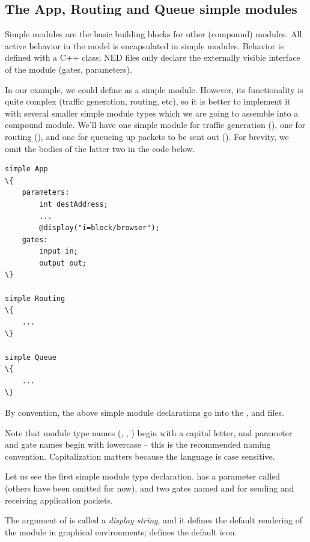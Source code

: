 \subsection{The App, Routing and Queue simple modules}

Simple modules are the basic building blocks for other (compound) modules.
All active behavior in the model is encapsulated in simple modules.
Behavior is defined with a C++ class; NED files only declare the externally
visible interface of the module (gates, parameters).

In our example, we could define  as a simple module. However,
its functionality is quite complex (traffic generation, routing, etc),
so it is better to implement it with several smaller simple module types
which we are going to assemble into a compound module. We'll have
one simple module for traffic generation (), one for routing
(), and one for queueing up packets to be sent out ().
For brevity, we omit the bodies of the latter two in the code below.

\begin{Verbatim}[commandchars=\\\{\}]
simple App
\{
    parameters:
        int destAddress;
        ...
        @display("i=block/browser");
    gates:
        input in;
        output out;
\}

simple Routing
\{
    ...
\}

simple Queue
\{
    ...
\}
\end{Verbatim}

By convention, the above simple module declarations go into the
,  and  files.

\begin{note}
    Note that module type names (, , )
    begin with a capital letter, and parameter and gate names begin with
    lowercase -- this is the recommended naming convention. Capitalization
    matters because the language is case sensitive.
\end{note}

Let us see the first simple module type declaration.  has a
parameter called  (others have been omitted for now),
and two gates named  and  for sending and receiving
application packets.

The argument of  is called a \textit{display string},
and it defines the default rendering of the module in graphical environments;
 defines the default icon.

